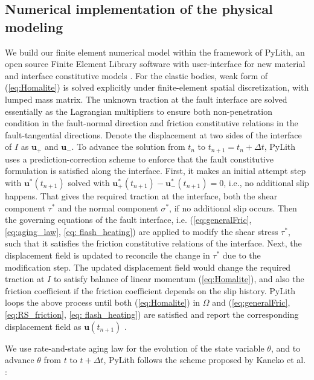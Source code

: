 \documentclass[final,a4paper]{elsarticle}
\begin{document}
\subsection{Numerical implementation of the physical modeling}
We build our finite element numerical model within the framework of PyLith, 
an open source Finite Element Library software with user-interface for new material and interface constitutive models \cite{Aagaard:Knepley:Williams:JGR:2013, PyLith:manual, PyLith:software}. 
For the elastic bodies, 
weak form of (\ref{eq:Homalite}) is solved explicitly under finite-element spatial discretization, 
with lumped mass matrix.  
The unknown traction at the fault interface are solved essentially as the Lagrangian multipliers to ensure both non-penetration condition in the fault-normal direction and friction constitutive relations in the fault-tangential directions. 
Denote the displacement at two sides of the interface of $I$ as $\boldsymbol{u}_{+}$ and $\boldsymbol{u}_{-}$. 
To advance the solution from $t_n$ to $t_{n+1} = t_n + \Delta t$, 
PyLith uses a prediction-correction scheme to enforce that the fault constitutive formulation is satisfied along the interface. 
First, 
it makes an initial attempt step with $\boldsymbol{u}^*(t_{n+1})$ solved with $\boldsymbol{u}_+^*(t_{n+1}) - \boldsymbol{u}_-^*(t_{n+1}) = 0$,  
i.e., 
no additional slip happens. 
That gives the required traction at the interface, 
both the shear component $\tau^*$ and the normal component $\sigma^*$, 
if no additional slip occurs. 
Then the governing equations of the fault interface, 
i.e. (\ref{eq:generalFric}, \ref{eq:aging_law}, \ref{eq: flash_heating}) are applied to modify the shear stress $\tau^*$, 
such that it satisfies the friction constitutive relations of the interface. 
Next, 
the displacement field is updated to reconcile the change in $\tau^*$ due to the modification step. 
The updated displacement field would change the required traction at $I$ to satisfy balance of linear momentum (\ref{eq:Homalite}), 
and also the friction coefficient if the friction coefficient depends on the slip history. 
PyLith loops the above process until both (\ref{eq:Homalite}) in $\Omega$ and (\ref{eq:generalFric}, \ref{eq:RS_friction}, \ref{eq: flash_heating}) are satisfied and report the corresponding displacement field as $\boldsymbol{u}(t_{n+1})$ \cite{PyLith:manual, PyLith:software}. 

We use rate-and-state aging law for the evolution of the state variable $\theta$, 
and to advance $\theta$ from $t$ to $t+\Delta t$, 
PyLith follows the scheme proposed by Kaneko et al. \cite{kaneko_spectral_2008, PyLith:manual}:
\end{document}
